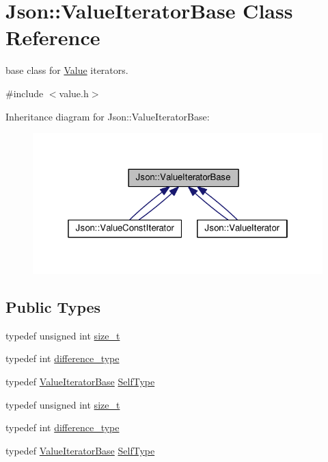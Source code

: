 \hypertarget{classJson_1_1ValueIteratorBase}{\section{Json\-:\-:Value\-Iterator\-Base Class Reference}
\label{dc/d8a/classJson_1_1ValueIteratorBase}
}


base class for \hyperlink{classJson_1_1Value}{Value} iterators.  




{\ttfamily \#include $<$value.\-h$>$}



Inheritance diagram for Json\-:\-:Value\-Iterator\-Base\-:
\nopagebreak
\begin{figure}[H]
\begin{center}
\leavevmode
\includegraphics[width=321pt]{d9/df6/classJson_1_1ValueIteratorBase__inherit__graph}
\end{center}
\end{figure}
\subsection*{Public Types}
\begin{DoxyCompactItemize}
\item 
typedef unsigned int \hyperlink{classJson_1_1ValueIteratorBase_a9d3a3c7ce5cdefe23cb486239cf07bb5}{size\-\_\-t}
\item 
typedef int \hyperlink{classJson_1_1ValueIteratorBase_a4e44bf8cbd17ec8d6e2c185904a15ebd}{difference\-\_\-type}
\item 
typedef \hyperlink{classJson_1_1ValueIteratorBase}{Value\-Iterator\-Base} \hyperlink{classJson_1_1ValueIteratorBase_a9d2a940d03ea06d20d972f41a89149ee}{Self\-Type}
\item 
typedef unsigned int \hyperlink{classJson_1_1ValueIteratorBase_a9d3a3c7ce5cdefe23cb486239cf07bb5}{size\-\_\-t}
\item 
typedef int \hyperlink{classJson_1_1ValueIteratorBase_a4e44bf8cbd17ec8d6e2c185904a15ebd}{difference\-\_\-type}
\item 
typedef \hyperlink{classJson_1_1ValueIteratorBase}{Value\-Iterator\-Base} \hyperlink{classJson_1_1ValueIteratorBase_a9d2a940d03ea06d20d972f41a89149ee}{Self\-Type}
\end{DoxyCompactItemize}
